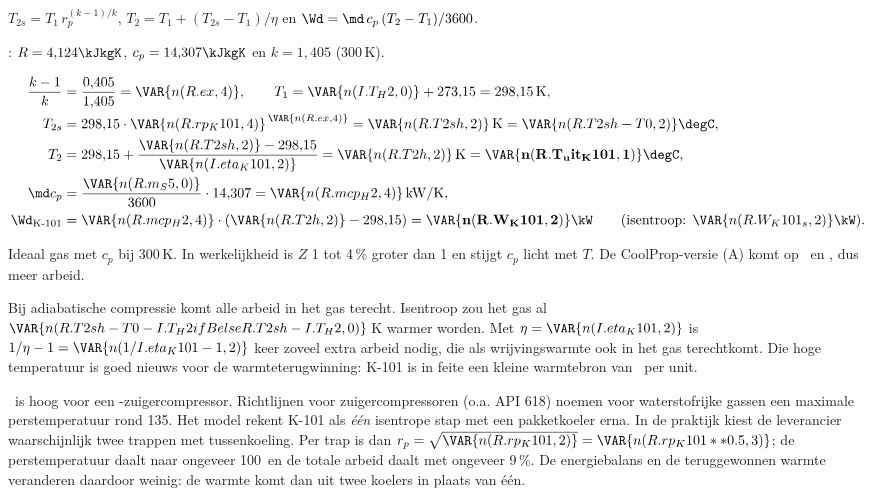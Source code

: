 \begin{methode}
$T_{2s} = T_1\,r_p^{(k-1)/k}$, $T_2 = T_1 + (T_{2s}-T_1)/\eta$ en $\Wd = \md\,c_p\,(T_2-T_1)/3600$.
\end{methode}
\begin{tabelkader}[A-1 en A-2]
\HH: $R = 4{,}124\kJkgK$, $c_p = 14{,}307\kJkgK$ en $k = 1{,}405$ (300\,K).
\end{tabelkader}
\begin{align*}
\frac{k-1}{k} &= \frac{0{,}405}{1{,}405} = \VAR{n(R.ex,4)}, \qquad T_1 = \VAR{n(I.T_H2,0)} + 273{,}15 = 298{,}15\,\mathrm{K},\\
T_{2s} &= 298{,}15\cdot\VAR{n(R.rp_K101,4)}^{\,\VAR{n(R.ex,4)}} = \VAR{n(R.T2sh,2)}\,\mathrm{K} = \VAR{n(R.T2sh-T0,2)}\degC,\\
T_2 &= 298{,}15 + \frac{\VAR{n(R.T2sh,2)} - 298{,}15}{\VAR{n(I.eta_K101,2)}} = \VAR{n(R.T2h,2)}\,\mathrm{K} = \mathbf{\VAR{n(R.T_uit_K101,1)}\degC},\\
\md c_p &= \frac{\VAR{n(R.m_S5,0)}}{3600}\cdot 14{,}307 = \VAR{n(R.mcp_H2,4)}\,\mathrm{kW/K},\\
\Wd_{\text{K-101}} &= \VAR{n(R.mcp_H2,4)}\cdot(\VAR{n(R.T2h,2)} - 298{,}15) = \mathbf{\VAR{n(R.W_K101,2)}\kW}
\qquad(\text{isentroop: } \VAR{n(R.W_K101_s,2)}\kW).
\end{align*}
\begin{aanname}
Ideaal gas met $c_p$ bij 300\,K. In werkelijkheid is $Z$ 1 tot 4\,\% groter dan 1 en stijgt $c_p$ licht met $T$.
De CoolProp-versie (A) komt op \kW\ en \degC, dus
 meer arbeid.
\end{aanname}
\begin{waarom}
Bij adiabatische compressie komt alle arbeid in het gas terecht. Isentroop zou het gas al
$\VAR{n(R.T2sh - T0 - I.T_H2 if B else R.T2sh - I.T_H2,0)}$\,K warmer worden. Met $\eta = \VAR{n(I.eta_K101,2)}$ is
$1/\eta - 1 = \VAR{n(1/I.eta_K101 - 1,2)}$ keer zoveel extra arbeid nodig, die als wrijvingswarmte ook in het gas
terechtkomt. Die hoge temperatuur is goed nieuws voor de warmteterugwinning: K-101 is in feite een kleine
warmtebron van \kW\ per unit.
\end{waarom}
\begin{letop}
\degC\ is hoog voor een \HH-zuigercompressor. Richtlijnen voor zuigercompressoren (o.a. API 618)
noemen voor waterstofrijke gassen een maximale perstemperatuur rond 135\degC. Het model rekent K-101 als
\emph{één} isentrope stap met een pakketkoeler erna. In de praktijk kiest de leverancier waarschijnlijk twee trappen
met tussenkoeling. Per trap is dan $r_p = \sqrt{\VAR{n(R.rp_K101,2)}} = \VAR{n(R.rp_K101**0.5,3)}$; de perstemperatuur
daalt naar ongeveer 100\degC\ en de totale arbeid daalt met ongeveer 9\,\%. De energiebalans en de teruggewonnen
warmte veranderen daardoor weinig: de warmte komt dan uit twee koelers in plaats van één.
\end{letop}

